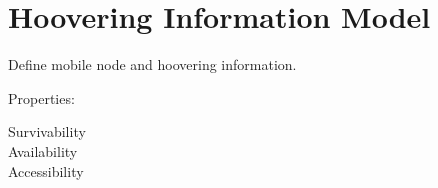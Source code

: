 \section{Hoovering Information Model}

Define mobile node and hoovering information.

Properties:
\begin{description}
	\item[Survivability]
	\item[Availability]
	\item[Accessibility]
\end{description}
